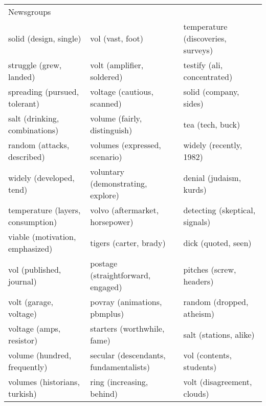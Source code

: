 \begin{table}[]
\begin{tabular}{lll}
		Newsgroups                               &                                                   &                                                          \\
		solid (design, single)                   & vol (vast, foot)                                  & temperature (discoveries, surveys)                       \\
		struggle (grew, landed)                  & volt (amplifier, soldered)                        & testify (ali, concentrated)                              \\
		spreading (pursued, tolerant)            & voltage (cautious, scanned)                       & solid (company, sides)                                   \\
		salt (drinking, combinations)            & volume (fairly, distinguish)                      & tea (tech, buck)                                         \\
		random (attacks, described)              & volumes (expressed, scenario)                     & widely (recently, 1982)                                  \\
		widely (developed, tend)                 & voluntary (demonstrating, explore)                & denial (judaism, kurds)                                  \\
		temperature (layers, consumption)        & volvo (aftermarket, horsepower)                   & detecting (skeptical, signals)                           \\
		viable (motivation, emphasized)          & tigers (carter, brady)                            & dick (quoted, seen)                                      \\
		vol (published, journal)                 & postage (straightforward, engaged)                & pitches (screw, headers)                                 \\
		volt (garage, voltage)                   & povray (animations, pbmplus)                      & random (dropped, atheism)                                \\
		voltage (amps, resistor)                 & starters (worthwhile, fame)                       & salt (stations, alike)                                   \\
		volume (hundred, frequently)             & secular (descendants, fundamentalists)            & vol (contents, students)                                 \\
		volumes (historians, turkish)            & ring (increasing, behind)                         & volt (disagreement, clouds)                              \\

\end{tabular}
\end{table}
